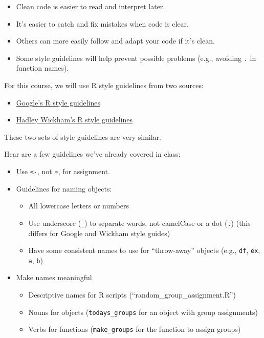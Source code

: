 \documentclass[]{book}
\providecommand{\tightlist}{%
  \setlength{\itemsep}{0pt}\setlength{\parskip}{0pt}}
\theoremstyle{definition}
\theoremstyle{definition}
\theoremstyle{definition}
\theoremstyle{remark}
\begin{document}
\begin{itemize}
\tightlist
\item
  Clean code is easier to read and interpret later.
\item
  It's easier to catch and fix mistakes when code is clear.
\item
  Others can more easily follow and adapt your code if it's clean.
\item
  Some style guidelines will help prevent possible problems (e.g.,
  avoiding \texttt{.} in function names).
\end{itemize}

For this course, we will use R style guidelines from two sources:

\begin{itemize}
\tightlist
\item
  \href{https://google.github.io/styleguide/Rguide.xml}{Google's R style
  guidelines}
\item
  \href{http://adv-r.had.co.nz/Style.html}{Hadley Wickham's R style
  guidelines}
\end{itemize}

These two sets of style guidelines are very similar.

Hear are a few guidelines we've already covered in class:

\begin{itemize}
\tightlist
\item
  Use \texttt{\textless{}-}, not \texttt{=}, for assignment.
\item
  Guidelines for naming objects:

  \begin{itemize}
  \tightlist
  \item
    All lowercase letters or numbers
  \item
    Use underscore (\texttt{\_}) to separate words, not camelCase or a
    dot (\texttt{.}) (this differs for Google and Wickham style guides)
  \item
    Have some consistent names to use for ``throw-away'' objects (e.g.,
    \texttt{df}, \texttt{ex}, \texttt{a}, \texttt{b})
  \end{itemize}
\item
  Make names meaningful

  \begin{itemize}
  \tightlist
  \item
    Descriptive names for R scripts (``random\_group\_assignment.R'')
  \item
    Nouns for objects (\texttt{todays\_groups} for an object with group
    assignments)
  \item
    Verbs for functions (\texttt{make\_groups} for the function to
    assign groups)
  \end{itemize}
\end{itemize}
\end{document}
